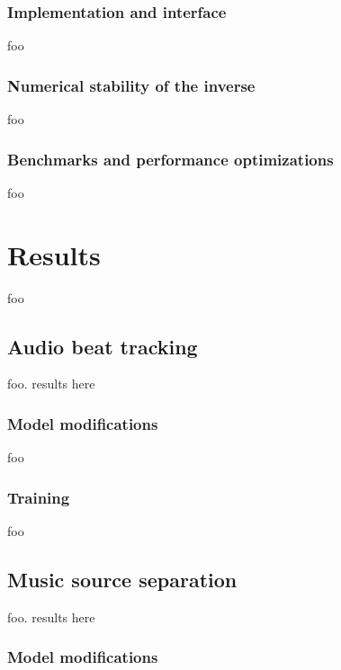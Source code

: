 \documentclass[letter,12pt,notitlepage]{article}
\begin{document}
\subsubsection{Implementation and interface}

foo

\subsubsection{Numerical stability of the inverse}

foo

\subsubsection{Benchmarks and performance optimizations}

foo

\vfill
\clearpage

\section{Results}
\label{sec:results}

foo

\subsection{Audio beat tracking}

foo. results here

\subsubsection{Model modifications}

foo

\subsubsection{Training}

foo

\subsection{Music source separation}

foo. results here

\subsubsection{Model modifications}
\end{document}
